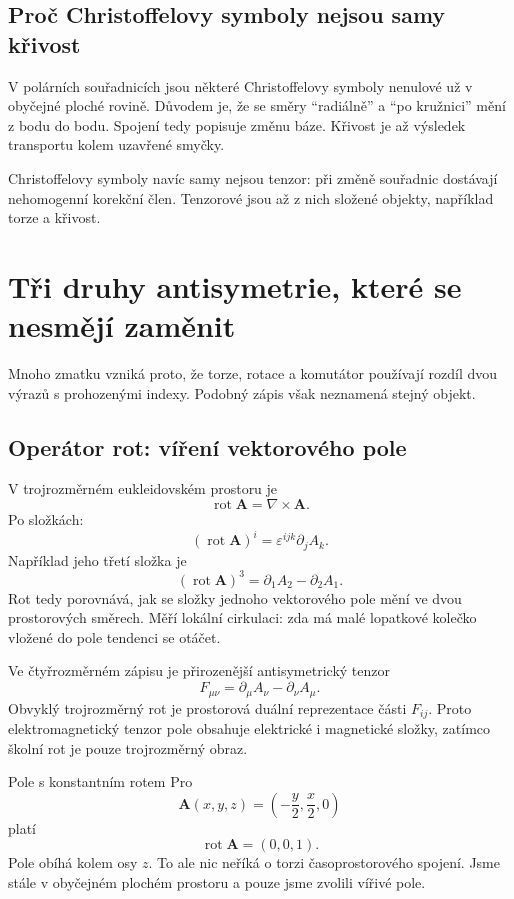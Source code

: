 \subsection{Proč Christoffelovy symboly nejsou samy křivost}
V polárních souřadnicích jsou některé Christoffelovy symboly nenulové už v
obyčejné ploché rovině. Důvodem je, že se směry ``radiálně'' a ``po kružnici''
mění z bodu do bodu. Spojení tedy popisuje změnu báze. Křivost je až výsledek
transportu kolem uzavřené smyčky.

Christoffelovy symboly navíc samy nejsou tenzor: při změně souřadnic dostávají
nehomogenní korekční člen. Tenzorové jsou až z nich složené objekty, například
torze a křivost.

\section{Tři druhy antisymetrie, které se nesmějí zaměnit}

Mnoho zmatku vzniká proto, že torze, rotace a komutátor používají rozdíl dvou
výrazů s prohozenými indexy. Podobný zápis však neznamená stejný objekt.

\subsection{Operátor rot: víření vektorového pole}
V trojrozměrném eukleidovském prostoru je
\[
  \operatorname{rot}\mathbf A=\nabla\times\mathbf A.
\]
Po složkách:
\[
  (\operatorname{rot}\mathbf A)^i
  =\varepsilon^{ijk}\partial_j A_k.
\]
Například jeho třetí složka je
\[
  (\operatorname{rot}\mathbf A)^3
  =\partial_1A_2-\partial_2A_1.
\]
Rot tedy porovnává, jak se složky jednoho vektorového pole mění ve dvou
prostorových směrech. Měří lokální cirkulaci: zda má malé lopatkové kolečko
vložené do pole tendenci se otáčet.

Ve čtyřrozměrném zápisu je přirozenější antisymetrický tenzor
\[
  F_{\mu\nu}=\partial_\mu A_\nu-\partial_\nu A_\mu.
\]
Obvyklý trojrozměrný rot je prostorová duální reprezentace části $F_{ij}$.
Proto elektromagnetický tenzor pole obsahuje elektrické i magnetické složky,
zatímco školní rot je pouze trojrozměrný obraz.

\begin{examplebox}{Pole s konstantním rotem}
Pro
\[
  \mathbf A(x,y,z)=\left(-\frac y2,\frac x2,0\right)
\]
platí
\[
  \operatorname{rot}\mathbf A=(0,0,1).
\]
Pole obíhá kolem osy $z$. To ale nic neříká o torzi časoprostorového spojení.
Jsme stále v obyčejném plochém prostoru a pouze jsme zvolili vířivé pole.
\end{examplebox}

